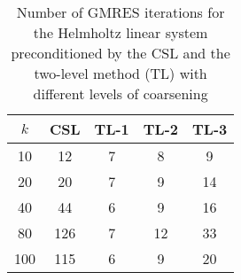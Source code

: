 \begin{table}[t]
\centering
\begin{tabular}{ccccc}
\hline
$k$ & CSL & TL-1 & TL-2 & TL-3 \\ \hline
10 & 12 & 7 & 8 & 9 \\
20 & 20 & 7 & 9 & 14 \\
40 & 44 & 6 & 9 & 16 \\
80 & 126 & 7 & 12 & 33 \\
100 & 115 & 6 & 9 & 20 \\
\hline
\end{tabular}
\caption{Number of GMRES iterations for the Helmholtz linear system preconditioned by the  CSL and the two-level method (TL) with different levels of coarsening}
\label{table:gmres_csl_vs_adef_coarse_eps_5}
\end{table}
